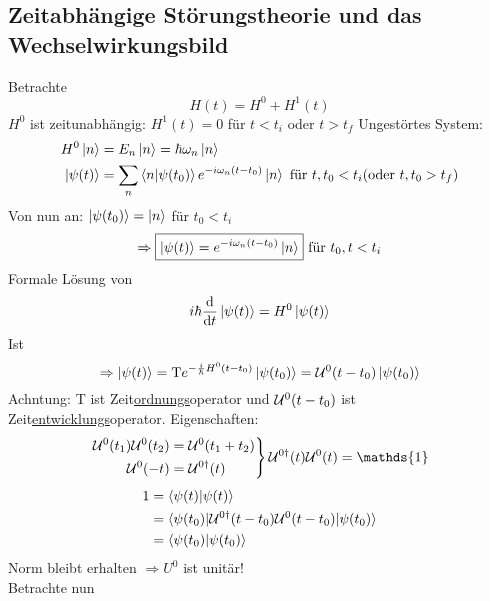 	\subsection{Zeitabhängige Störungstheorie und das Wechselwirkungsbild}
	Betrachte 
		\begin{equation*}
			H(t) = H^0 + H^1 (t)
		\end{equation*}
	$H^0$ ist zeitunabhängig: $H^1(t) = 0$ für $t < t_i$ oder $t > t_f$
	Ungestörtes System: 
		\begin{align*}
			H^0 \ket{n} &= E_n \ket{n} = \hbar \omega_n \ket{n} \\
			\ket{\psi(t)} &= \sum_n \braket{n | \psi(t_0)} e^{-i \omega_n (t-t_0)} \ket{n} \text{~für~} t, t_0 < t_i (\text{oder~} t, t_0 > t_f)
		\end{align*}
	Von nun an: $\ket{\psi(t_0)} = \ket{n}$ für $t_0 < t_i$
		\begin{equation*}
			\Rightarrow \boxed{\ket{\psi (t)} = e^{-i \omega_n (t-t_0)} \ket{n}
			} \text{~für~} t_0, t < t_i
		\end{equation*}		
	Formale Lösung von 
		\begin{equation*}
			i \hbar \frac{\mathrm{d}}{\mathrm{d} t} \ket{\psi(t)}
			= H^0 \ket{\psi(t)}
		\end{equation*}			
	Ist
		\begin{equation*}
			\Rightarrow \ket{\psi(t)} = \text{T} e^{-\frac{i}{\hbar} H^0 (t-t_0)} 
			\ket{\psi(t_0)} = \mathcal{U}^0(t-t_0) \ket{\psi(t_0)}
		\end{equation*}
	Achntung: T ist Zeit\underline{ordnungs}operator und $\mathcal{U}^0(t-t_0)$ ist Zeit\underline{entwicklungs}operator.
	Eigenschaften:
		\begin{align*}
			\left.
			\begin{aligned}
				\U^0(t_1) \U^0(t_2) &= \U^0(t_1 + t_2) \\
				\U^0(-t) &= \U^{0\dagger} (t)		
			\end{aligned}
			\right\} \U^{0\dagger} (t) \U^0 (t) = \mathds{1}
		\end{align*}
		\begin{align*}
			1 &= \braket{\psi(t) | \psi(t)} \\
			&= \braket{\psi(t_0) | \mathcal{U}^{0 \dagger} (t-t_0) \mathcal{U}^0 (t-t_0) | \psi(t_0)} \\
			&= \braket{\psi(t_0) | \psi(t_0)}
		\end{align*}
	Norm bleibt erhalten $\Rightarrow U^0$ ist unitär! \\
	Betrachte nun 
